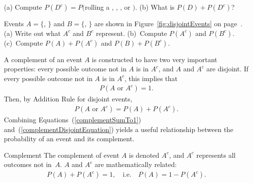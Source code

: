 \begin{exercisewrap}
\begin{nexercise}
(a) Compute $P(D^c) = P($rolling a , , , or $)$. (b) What is $P(D) + P(D^c)$?\footnotemark{}
\end{nexercise}
\end{exercisewrap}

\begin{exercisewrap}
\begin{nexercise}
Events $A=\{$, $\}$ and $B=\{$, $\}$ are shown in Figure~\ref{fig:disjointEvents} on page~\pageref{fig:disjointEvents}. (a) Write out what $A^c$ and $B^c$ represent. (b)~Compute $P(A^c)$ and $P(B^c)$. (c)~Compute $P(A)+P(A^c)$ and $P(B)+P(B^c)$.\footnotemark{}
\end{nexercise}
\end{exercisewrap}

A complement of an event $A$ is constructed to have two very important properties: every possible outcome not in $A$ is in $A^c$, and $A$ and $A^c$ are disjoint. If every possible outcome not in $A$ is in $A^c$, this implies that
\begin{eqnarray}
P(A\text{ or }A^c) = 1.
\label{complementSumTo1}
\end{eqnarray}
Then, by Addition Rule for disjoint events,
\begin{eqnarray}
P(A\text{ or }A^c) = P(A) + P(A^c).
\label{complementDisjointEquation}
\end{eqnarray}
Combining Equations~(\ref{complementSumTo1}) and~(\ref{complementDisjointEquation}) yields a useful relationship between the probability of an event and its complement.

\begin{onebox}{Complement}
The complement of event $A$ is denoted $A^c$, and $A^c$ represents all outcomes not in~$A$. $A$ and $A^c$ are mathematically related: \vspace{-2mm}
\begin{eqnarray}\label{complement}
P(A) + P(A^c) = 1, \quad\text{i.e.}\quad P(A) = 1-P(A^c).
\end{eqnarray}
\end{onebox}

